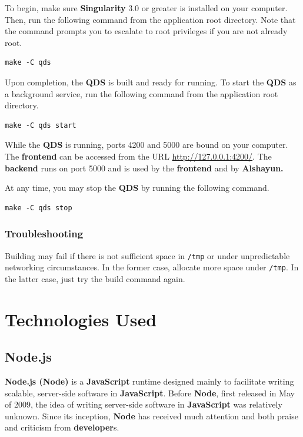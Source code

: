 \documentclass[12pt]{report}
\begin{document}
To begin, make sure \textbf{Singularity} 3.0 \cite{singularity3inst} or greater
is installed on your computer. Then, run the following command from the
application root directory. Note that the command prompts you to escalate to
root privileges if you are not already root.

\begin{verbatim}
make -C qds
\end{verbatim}

Upon completion, the \textbf{QDS} is built and ready for running. To start the
\textbf{QDS} as a background service, run the following command from the
application root directory.

\begin{verbatim}
make -C qds start
\end{verbatim}

While the \textbf{QDS} is running, ports 4200 and 5000 are bound on your
computer. The \textbf{frontend} can be accessed from the URL
\url{http://127.0.0.1:4200/}. The \textbf{backend} runs on port 5000 and is used
by the \textbf{frontend} and by \textbf{Alshayun.}

At any time, you may stop the \textbf{QDS} by running the following command.

\begin{verbatim}
make -C qds stop
\end{verbatim}

        \subsection{Troubleshooting}

Building may fail if there is not sufficient space in \texttt{/tmp} or under
unpredictable networking circumstances. In the former case, allocate more space
under \texttt{/tmp}. In the latter case, just try the build command again.

\chapter{Technologies Used}

    \section{Node.js}

\textbf{Node\@.js (Node)} \cite{nodejs} is a \textbf{JavaScript} runtime
designed mainly to facilitate writing scalable, server-side software in
\textbf{JavaScript}. Before \textbf{Node}, first released in May of 2009, the
idea of writing server-side software in \textbf{JavaScript} was relatively
unknown. Since its inception, \textbf{Node} has received much attention and both
praise and criticism from \textbf{developer}s.
\end{document}

